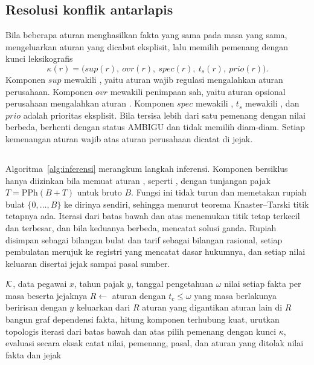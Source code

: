 \subsection{Resolusi konflik antarlapis}
Bila beberapa aturan menghasilkan fakta yang sama pada masa yang sama,  mengeluarkan aturan yang dicabut eksplisit, lalu memilih pemenang dengan kunci leksikografis
\begin{equation}
\kappa(r) = \big(\mathit{sup}(r),\ \mathit{ovr}(r),\ \mathit{spec}(r),\ t_s(r),\ \mathit{prio}(r)\big).
\label{eq:kunci}
\end{equation}
Komponen $\mathit{sup}$ mewakili , yaitu aturan wajib regulasi mengalahkan aturan perusahaan. Komponen $\mathit{ovr}$ mewakili penimpaan sah, yaitu aturan opsional perusahaan mengalahkan aturan . Komponen $\mathit{spec}$ mewakili , $t_s$ mewakili , dan $\mathit{prio}$ adalah prioritas eksplisit. Bila tersisa lebih dari satu pemenang dengan nilai berbeda,  berhenti dengan status AMBIGU dan tidak memilih diam-diam. Setiap kemenangan aturan wajib atas aturan perusahaan dicatat di jejak.

\subsection{}
Algoritma~\ref{alg:inferensi} merangkum langkah inferensi. Komponen bersiklus hanya diizinkan bila memuat aturan , seperti , dengan tunjangan pajak $T = \mathrm{PPh}(B + T)$ untuk bruto $B$. Fungsi ini tidak turun dan memetakan rupiah bulat $\{0, \dots, B\}$ ke dirinya sendiri, sehingga menurut teorema Knaster--Tarski titik tetapnya ada. Iterasi dari batas bawah dan atas menemukan titik tetap terkecil dan terbesar, dan bila keduanya berbeda,  mencatat solusi ganda. Rupiah disimpan sebagai bilangan bulat dan tarif sebagai bilangan rasional, setiap pembulatan merujuk ke registri yang mencatat dasar hukumnya, dan setiap nilai keluaran disertai jejak sampai pasal sumber.

\begin{algorithm}[t]
\caption{Inferensi untuk satu pegawai dan satu tahun pajak}
\label{alg:inferensi}
\footnotesize
\begin{algorithmic}[1]
\Require $\mathcal{K}$, data pegawai $x$, tahun pajak $y$, tanggal pengetahuan $\omega$
\Ensure nilai setiap fakta per masa beserta jejaknya
\State $R \gets$ aturan dengan $t_c \le \omega$ yang masa berlakunya beririsan dengan $y$
\State keluarkan dari $R$ aturan yang digantikan aturan lain di $R$
\State bangun graf dependensi fakta, hitung komponen terhubung kuat, urutkan topologis
    \State iterasi  dari batas bawah dan atas
  \Else
      \State pilih pemenang dengan kunci $\kappa$, evaluasi secara eksak
      \State catat nilai, pemenang, pasal, dan aturan yang ditolak
    \EndFor
  \EndIf
\EndFor
\State \Return nilai fakta dan jejak
\end{algorithmic}
\end{algorithm}
